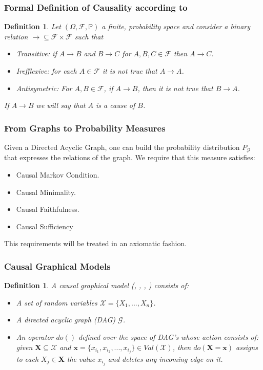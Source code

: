 \documentclass{beamer}
\theoremstyle{plain}
\newtheorem{defi}[teo]{Definition}
\begin{document}
		\begin{frame}
		\frametitle{Formal Definition of Causality according to \cite{spirtes2000causation}}
		\begin{defi}
		Let $(\Omega, \mathcal{F}, \mathbb{P})$ a finite, probability space and consider a binary relation  $\to  \subseteq \mathcal{F} \times \mathcal{F}$ such that
		\begin{itemize}
		\item Transitive: if $A \to B$ and $B \to C$ for $A,B,C \in \mathcal{F}$ then $A \to C$.
		\item  Irefflexive: for each $A \in \mathcal{F}$ it is not true that $A \to A$.
		\item Antisymetric: For $A, B \in \mathcal{F}$, if $A \to B$, then it is not true that $B \to A$.
		\end{itemize}
		If $A \to B$ we will say that $A$ is a cause of $B$.
		\end{defi}
		\end{frame}
		
		\begin{frame}
		\frametitle{From Graphs to Probability Measures}
		Given a Directed Acyclic Graph, one can build the probability distribution $P_\mathcal{G}$ that expresses the relations of the graph. We require that this measure satisfies:
        \begin{itemize}
        \item Causal Markov Condition.
        \item Causal Minimality.
         \item Causal Faithfulness.
         \item Causal Sufficiency
        \end{itemize}
         This requirements will be treated in an axiomatic fashion.
		\end{frame}
		
	\begin{frame}
	\frametitle{Causal Graphical Models}
	\begin{defi}
	A causal graphical model (\cite{spirtes2000causation}, \cite{pearl2009causality}, \cite{koller2003multi}, \cite{sucar2015probabilistic}) consists of:
	\begin{itemize}
	 \item A set of random variables $\mathcal{X}=\{ X_1,...,X_n \}$.
	 \item A directed acyclic graph (DAG) $\mathcal{G}$.
	 \item An operator $do()$ defined over the space of DAG's whose action consists of: given $\mathbf{X} \subseteq \mathcal{X}$ and $\mathbf{x} = \{ x_{i_1}, x_{i_2}, ... , x_{i_j} \} \in Val(\mathcal{X})$, then $do(\mathbf{X} = \mathbf{x} )$ assigns to each $X_j \in \mathbf{X}$ the value $x_{i_j}$ and deletes any incoming edge on it.
	 \end{itemize}
	 \end{defi}
	 \end{frame}
\end{document}
